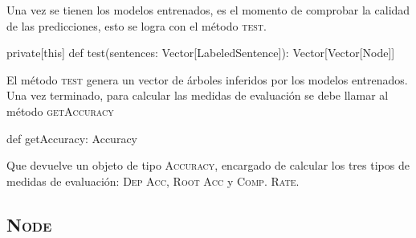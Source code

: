 Una vez se tienen los modelos entrenados, es el momento de comprobar la calidad
de las predicciones, esto se logra con el método \textsc{test}.
\begin{scala2}
private[this] def test(sentences: Vector[LabeledSentence]): Vector[Vector[Node]]
\end{scala2}
El método \textsc{test} genera un vector de árboles inferidos por los modelos
entrenados. Una vez terminado, para calcular las medidas de evaluación se debe
llamar al método \textsc{getAccuracy}
\begin{scala2}
def getAccuracy: Accuracy
\end{scala2}
Que devuelve un objeto de tipo \textsc{Accuracy}, encargado de calcular los tres
tipos de medidas de evaluación: \textsc{Dep Acc, Root Acc} y
\textsc{Comp. Rate}.

\subsection{\textsc{Node}}
\label{subsec:node}


